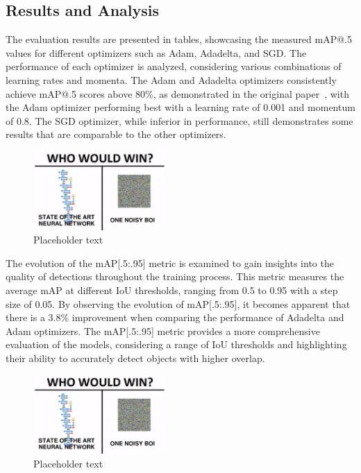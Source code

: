 \documentclass[a4paper,12pt]{article}
\begin{document}
\begin{multicols}{2}
\section{Results and Analysis}\label{sec:results-and-analysis}

The evaluation results are presented in tables, showcasing the measured mAP@.5 values for different optimizers such as Adam, Adadelta, and SGD. The performance of each optimizer is analyzed, considering various combinations of learning rates and momenta.
The Adam and Adadelta optimizers consistently achieve mAP@.5 scores above 80\%, as demonstrated in the original paper~\cite{MVDTHME}, with the Adam optimizer performing best with a learning rate of 0.001 and momentum of 0.8. The SGD optimizer, while inferior in performance, still demonstrates some results that are comparable to the other optimizers.

\begin{figure}[H]
    \centering
    \includegraphics[width=0.45\textwidth]{placeholder}
    \caption{Placeholder text}
    \label{fig:1}
\end{figure}

The evolution of the mAP[.5:.95] metric is examined to gain insights into the quality of detections throughout the training process.
This metric measures the average mAP at different IoU thresholds, ranging from 0.5 to 0.95 with a step size of 0.05.
By observing the evolution of mAP[.5:.95], it becomes apparent that there is a 3.8\% improvement when comparing the performance of Adadelta and Adam optimizers.
The mAP[.5:.95] metric provides a more comprehensive evaluation of the models, considering a range of IoU thresholds and highlighting their ability to accurately detect objects with higher overlap.

\begin{figure}[H]
    \centering
    \includegraphics[width=0.45\textwidth]{placeholder}
    \caption{Placeholder text}
    \label{fig:2}
\end{figure}



\end{multicols}
\end{document}
